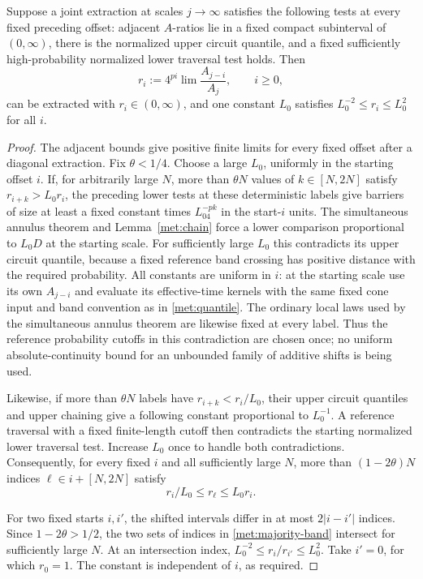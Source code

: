 \begin{lemma}
\label{met:majority}
Suppose a joint extraction at scales $j\to\infty$ satisfies the
following tests at every fixed preceding offset: adjacent
$A$-ratios lie in a fixed compact subinterval of $(0,\infty)$,
there is the normalized upper circuit quantile, and a fixed
sufficiently high-probability normalized lower traversal test
holds.  Then
\[
 r_i:=4^{pi}\lim\frac{A_{j-i}}{A_j},\qquad i\geq0,
\]
can be extracted with $r_i\in(0,\infty)$, and one constant $L_0$
satisfies $L_0^{-2}\leq r_i\leq L_0^2$ for all $i$.
\end{lemma}

\begin{proof}
The adjacent bounds give positive finite limits for every fixed
offset after a diagonal extraction.  Fix $\theta<1/4$.  Choose a
large $L_0$, uniformly in the starting offset $i$.
If, for arbitrarily large $N$, more than $\theta N$ values of
$k\in[N,2N]$ satisfy $r_{i+k}>L_0r_i$, the preceding lower tests
at these deterministic labels give barriers of size at least a
fixed constant times $L_04^{-pk}$ in the start-$i$ units.
The simultaneous annulus theorem and
Lemma~\ref{met:chain} force a lower comparison proportional to
$L_0D$ at the starting scale.  For sufficiently large $L_0$ this
contradicts its upper circuit quantile, because a fixed reference
band crossing has positive distance with the required probability.
All constants are uniform in $i$: at the starting scale use its own
$A_{j-i}$ and evaluate its effective-time kernels with the same fixed
cone input and band convention as in \eqref{met:quantile}.  The
ordinary local laws used by the simultaneous annulus theorem are
likewise fixed at every label.  Thus the reference probability cutoffs
in this contradiction are chosen once; no uniform absolute-continuity
bound for an unbounded family of additive shifts is being used.

Likewise, if more than $\theta N$ labels have
$r_{i+k}<r_i/L_0$, their upper circuit quantiles and upper chaining
give a following constant proportional to $L_0^{-1}$.  A reference
traversal with a fixed finite-length cutoff then contradicts the
starting normalized lower traversal test.  Increase $L_0$ once to
handle both contradictions.  Consequently, for every fixed $i$
and all sufficiently large $N$, more than
$(1-2\theta)N$ indices $\ell\in i+[N,2N]$ satisfy
\begin{equation}
 r_i/L_0\leq r_\ell\leq L_0r_i.
 \label{met:majority-band}
\end{equation}

For two fixed starts $i,i'$, the shifted intervals differ in at
most $2|i-i'|$ indices.  Since $1-2\theta>1/2$, the two sets of
indices in \eqref{met:majority-band} intersect for sufficiently
large $N$.  At an intersection index,
$L_0^{-2}\leq r_i/r_{i'}\leq L_0^2$.  Take $i'=0$, for which
$r_0=1$.  The constant is independent of $i$, as required.
\end{proof}

